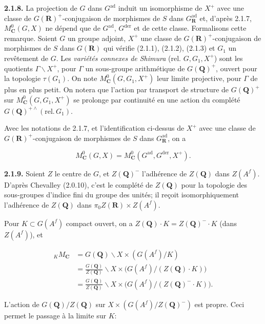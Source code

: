 \documentclass[10pt,a4paper]{article}
\begin{document}
\textbf{2.1.8.} La projection de \(G\) dans \(G^{\mathrm{ad}}\) induit un isomorphisme de \(X^+\) avec une classe de \(G(\mathbf R)^+\)-conjugaison de morphismes de \(S\) dans \(G_{\mathbf R}^{\mathrm{ad}}\) et, d'après 2.1.7, \(M_{\mathbf C}^0(G,X)\) ne dépend que de \(G^{\mathrm{ad}}\), \(G^{\mathrm{der}}\) et de cette classe. Formalisons cette remarque. Soient \(G\) un groupe adjoint, \(X^+\) une classe de \(G(\mathbf R)^+\)-conjugaison de morphismes de \(S\) dans \(G(\mathbf R)\) qui vérifie (2.1.1), (2.1.2), (2.1.3) et \(G_1\) un revêtement de \(G\). Les \emph{variétés connexes de Shimura} (rel. \(G,G_1,X^+\)) sont les quotients \(\Gamma\backslash X^+\), pour \(\Gamma\) un sous-groupe arithmétique de \(G(\mathbf Q)^+\), ouvert pour la topologie \(\tau(G_1)\). On note \(M_{\mathbf C}^0(G,G_1,X^+)\) leur limite projective, pour \(\Gamma\) de plus en plus petit. On notera que l'action par transport de structure de \(G(\mathbf Q)^+\) sur \(M_{\mathbf C}^0(G,G_1,X^+)\) se prolonge par continuité en une action du complété \(G(\mathbf Q)^{+\wedge}(\mathrm{rel.}\,G_1)\).

Avec les notations de 2.1.7, et l'identification ci-dessus de \(X^+\) avec une classe de \(G(\mathbf R)^+\)-conjugaison de morphismes de \(S\) dans \(G_{\mathbf R}^{\mathrm{ad}}\), on a

\[
M_{\mathbf C}^0(G,X)=M_{\mathbf C}^0(G^{\mathrm{ad}},G^{\mathrm{der}},X^+).
\]

\textbf{2.1.9.} Soient \(Z\) le centre de \(G\), et \(Z(\mathbf Q)^{-}\) l'adhérence de \(Z(\mathbf Q)\) dans \(Z(A^f)\). D'après Chevalley (2.0.10), c'est le complété de \(Z(\mathbf Q)\) pour la topologie des sous-groupes d'indice fini du groupe des unités; il reçoit isomorphiquement l'adhérence de \(Z(\mathbf Q)\) dans \(\pi_0Z(\mathbf R)\times Z(A^f)\).

Pour \(K\subset G(A^f)\) compact ouvert, on a \(Z(\mathbf Q)\cdot K=Z(\mathbf Q)^{-}\cdot K\) (dans \(Z(A^f)\)), et

\[
\begin{aligned}
{}_K M_{\mathbf C}
&=G(\mathbf Q)\backslash X\times(G(A^f)/K)\\
&=\frac{G(\mathbf Q)}{Z(\mathbf Q)}\backslash X\times\bigl(G(A^f)/(Z(\mathbf Q)\cdot K)\bigr)\\
&=\frac{G(\mathbf Q)}{Z(\mathbf Q)}\backslash X\times\bigl(G(A^f)/(Z(\mathbf Q)^{-}\cdot K)\bigr).
\end{aligned}
\]

L'action de \(G(\mathbf Q)/Z(\mathbf Q)\) sur \(X\times(G(A^f)/Z(\mathbf Q)^{-})\) est propre. Ceci permet le passage à la limite sur \(K\):
\end{document}
